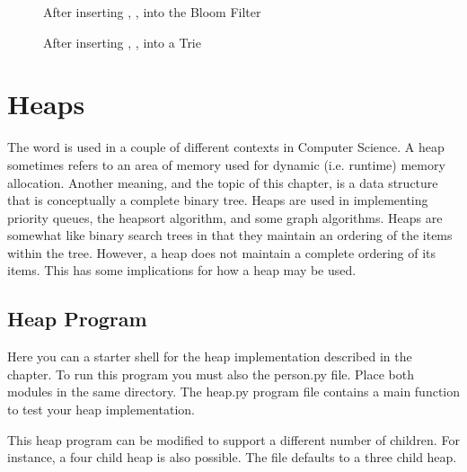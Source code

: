 \documentclass[letterpaper,10pt,english]{sphinxmanual}
\begin{document}
\begin{figure}[htbp]
\centering
\capstart

\noindent{}
\caption{After inserting , ,  into the Bloom Filter}\label{\detokenize{chap11/chap11:id3}}\end{figure}

\begin{figure}[htbp]
\centering
\capstart

\noindent{}
\caption{After inserting , ,  into a Trie}\label{\detokenize{chap11/chap11:id4}}\end{figure}


\chapter{Heaps}
\label{\detokenize{chap8/chap8:heaps}}\label{\detokenize{chap8/chap8:heapchap}}\label{\detokenize{chap8/chap8::doc}}
The word  is used in a couple of different contexts in Computer Science. A heap sometimes refers to an area of memory used for dynamic (i.e. run\sphinxhyphen{}time) memory allocation. Another meaning, and the topic of this chapter, is a data structure that is conceptually a complete binary tree. Heaps are used in implementing priority queues, the heapsort algorithm, and some graph algorithms. Heaps are somewhat like binary search trees in that they maintain an ordering of the items within the tree. However, a heap does not maintain a complete ordering of its items. This has some implications for how a heap may be used.


\section{Heap Program}
\label{\detokenize{chap8/chap8:heap-program}}
Here you can  a starter shell for the heap implementation described in the chapter.
To run this program you must also  the person.py file. Place both modules in the same directory. The heap.py program file contains a main function to test your heap implementation.

This heap program can be modified to support a different number of children. For instance, a four child heap is also possible. The file defaults to a three child heap.
\end{document}
